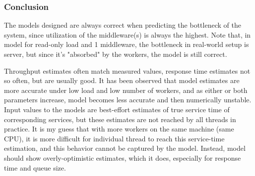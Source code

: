 \documentclass[11pt,a4paper]{article}
\begin{document}
\subsubsection{Conclusion}

The models designed are always correct when predicting the bottleneck of the system, since utilization of the middleware(s) is always the highest. Note that, in model for read-only load and 1 middleware, the bottleneck in real-world setup is server, but since it's "absorbed" by the workers, the model is still correct.

Throughput estimates often match measured values, response time estimates not so often, but are usually good. It has been observed that model estimates are more accurate under low load and low number of workers, and as either or both parameters increase, model becomes less accurate and then numerically unstable. Input values to the models are best-effort estimates of true service time of corresponding services, but these estimates are not reached by all threads in practice. It is my guess that with more workers on the same machine (same CPU), it is more difficult for individual thread to reach this service-time estimation, and this behavior cannot be captured by the model. Instead, model should show overly-optimistic estimates, which it does, especially for response time and queue size.
\end{document}
